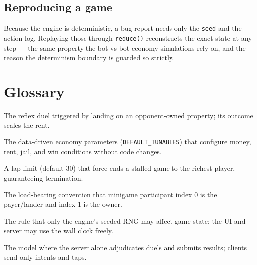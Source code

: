 \documentclass[11pt,a4paper]{article}
\newcommand{\code}[1]{\texttt{#1}}
\begin{document}
\subsection{Reproducing a game}
Because the engine is deterministic, a bug report needs only the \code{seed} and
the action log. Replaying those through \code{reduce()} reconstructs the exact
state at any step --- the same property the bot-vs-bot economy simulations rely
on, and the reason the determinism boundary is guarded so strictly.

\section{Glossary}
\begin{description}[leftmargin=0pt,style=nextline]
  \item[Rent Showdown] The reflex duel triggered by landing on an
        opponent-owned property; its outcome scales the rent.
  \item[Tunables] The data-driven economy parameters (\code{DEFAULT\_TUNABLES})
        that configure money, rent, jail, and win conditions without code
        changes.
  \item[Round cap] A lap limit (default 30) that force-ends a stalled game to
        the richest player, guaranteeing termination.
  \item[Participant ordering] The load-bearing convention that minigame
        participant index 0 is the payer/lander and index 1 is the owner.
  \item[Determinism boundary] The rule that only the engine's seeded RNG may
        affect game state; the UI and server may use the wall clock freely.
  \item[Authoritative server] The model where the server alone adjudicates
        duels and submits results; clients send only intents and taps.
\end{description}
\end{document}
